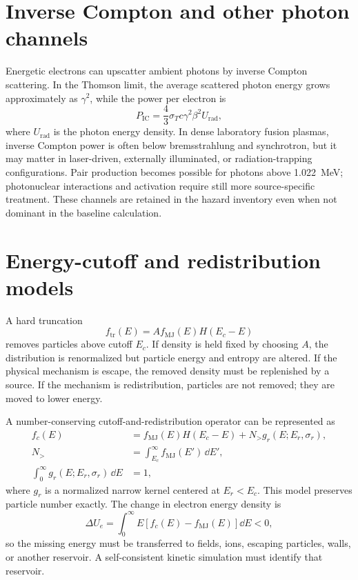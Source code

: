 \section{Inverse Compton and other photon channels}

Energetic electrons can upscatter ambient photons by inverse Compton scattering. In the Thomson limit, the average scattered photon energy grows approximately as $\gamma^2$, while the power per electron is
\begin{equation}
P_{\mathrm{IC}}=\frac{4}{3}\sigma_Tc\gamma^2\beta^2U_{\mathrm{rad}},
\end{equation}
where $U_{\mathrm{rad}}$ is the photon energy density. In dense laboratory fusion plasmas, inverse Compton power is often below bremsstrahlung and synchrotron, but it may matter in laser-driven, externally illuminated, or radiation-trapping configurations. Pair production becomes possible for photons above \SI{1.022}{\MeV}; photonuclear interactions and activation require still more source-specific treatment. These channels are retained in the hazard inventory even when not dominant in the baseline calculation.

\section{Energy-cutoff and redistribution models}

A hard truncation
\begin{equation}
 f_{\mathrm{tr}}(E)=A f_{\mathrm{MJ}}(E)H(E_c-E)
\label{eq:hardcut}
\end{equation}
removes particles above cutoff $E_c$. If density is held fixed by choosing $A$, the distribution is renormalized but particle energy and entropy are altered. If the physical mechanism is escape, the removed density must be replenished by a source. If the mechanism is redistribution, particles are not removed; they are moved to lower energy.

A number-conserving cutoff-and-redistribution operator can be represented as
\begin{align}
 f_c(E)&=f_{\mathrm{MJ}}(E)H(E_c-E)+N_{>}g_r(E;E_r,\sigma_r),\\
 N_{>}&=\int_{E_c}^{\infty}f_{\mathrm{MJ}}(E')\,\dd E',\\
 \int_0^\infty g_r(E;E_r,\sigma_r)\,\dd E&=1,
\label{eq:redistribution}
\end{align}
where $g_r$ is a normalized narrow kernel centered at $E_r<E_c$. This model preserves particle number exactly. The change in electron energy density is
\begin{equation}
\Delta U_e=\int_0^\infty E\left[f_c(E)-f_{\mathrm{MJ}}(E)\right]\dd E<0,
\label{eq:deltaU}
\end{equation}
so the missing energy must be transferred to fields, ions, escaping particles, walls, or another reservoir. A self-consistent kinetic simulation must identify that reservoir.

